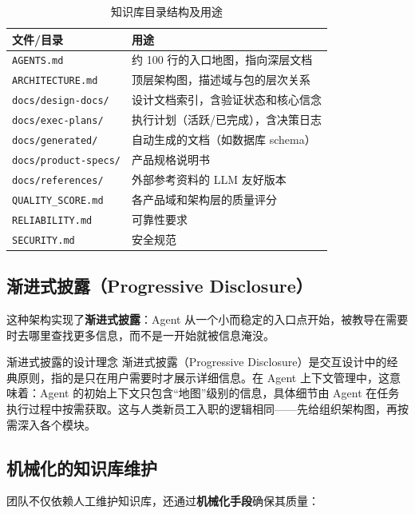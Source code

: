 \documentclass[a4paper]{article}
\begin{document}
\begin{table}[H]
\centering
\small
\begin{tabular}{p{5cm}p{8cm}}
\toprule
\textbf{文件/目录} & \textbf{用途} \\
\midrule
\texttt{AGENTS.md} & 约 100 行的入口地图，指向深层文档 \\
\texttt{ARCHITECTURE.md} & 顶层架构图，描述域与包的层次关系 \\
\texttt{docs/design-docs/} & 设计文档索引，含验证状态和核心信念 \\
\texttt{docs/exec-plans/} & 执行计划（活跃/已完成），含决策日志 \\
\texttt{docs/generated/} & 自动生成的文档（如数据库 schema） \\
\texttt{docs/product-specs/} & 产品规格说明书 \\
\texttt{docs/references/} & 外部参考资料的 LLM 友好版本 \\
\texttt{QUALITY\_SCORE.md} & 各产品域和架构层的质量评分 \\
\texttt{RELIABILITY.md} & 可靠性要求 \\
\texttt{SECURITY.md} & 安全规范 \\
\bottomrule
\end{tabular}
\caption{知识库目录结构及用途}
\end{table}

\subsection{渐进式披露（Progressive Disclosure）}

这种架构实现了\textbf{渐进式披露}：Agent 从一个小而稳定的入口点开始，被教导在需要时去哪里查找更多信息，而不是一开始就被信息淹没。

\begin{knowledgebox}{渐进式披露的设计理念}
渐进式披露（Progressive Disclosure）是交互设计中的经典原则，指的是只在用户需要时才展示详细信息。在 Agent 上下文管理中，这意味着：Agent 的初始上下文只包含``地图''级别的信息，具体细节由 Agent 在任务执行过程中按需获取。这与人类新员工入职的逻辑相同——先给组织架构图，再按需深入各个模块。
\end{knowledgebox}

\subsection{机械化的知识库维护}

团队不仅依赖人工维护知识库，还通过\textbf{机械化手段}确保其质量：
\end{document}
